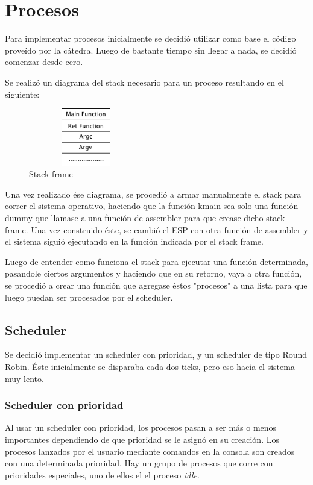 \documentclass[english]{article}
\begin{document}
\section{Procesos}

Para implementar procesos inicialmente se decidió utilizar como base el código proveído por la cátedra. Luego de bastante tiempo sin llegar a nada, se decidió comenzar desde cero.

Se realizó un diagrama del stack necesario para un proceso resultando en el siguiente:

\begin{figure}[H]
\begin{center}
\includegraphics[width=5cm,height=2.5cm,keepaspectratio]{stack}

\caption{Stack frame}
\end{center}
\end{figure}

Una vez realizado ése diagrama, se procedió a armar manualmente el stack para correr el sistema operativo, haciendo que la función kmain sea solo una función dummy que llamase a una función de assembler para que crease dicho stack frame. Una vez construido éste, se cambió el ESP con otra función de assembler y el sistema siguió ejecutando en la función indicada por el stack frame.

Luego de entender como funciona el stack para ejecutar una función determinada, pasandole ciertos argumentos y haciendo que en su retorno, vaya a otra función, se procedió a crear una función que agregase éstos "procesos" a una lista para que luego puedan ser procesados por el scheduler.

\subsection{Scheduler}
Se decidió implementar un scheduler con prioridad, y un scheduler de tipo Round Robin.
Éste inicialmente se disparaba cada dos ticks, pero eso hacía el sistema muy lento.

\subsubsection{Scheduler con prioridad}
Al usar un scheduler con prioridad, los procesos pasan a ser más o menos importantes dependiendo de que prioridad se le asignó en su creación. Los procesos lanzados por el usuario mediante comandos en la consola son creados con una determinada prioridad. Hay un grupo de procesos que corre con prioridades especiales, uno de ellos el el proceso \emph{idle}.
\end{document}
